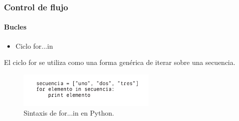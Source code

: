 \begin{frame}[fragile]
  \frametitle{Control de flujo}

    \framesubtitle{Bucles}    

  \begin{itemize}
    \item Ciclo for...in
  \end{itemize}

  El ciclo for se utiliza como una forma gen\'erica de iterar sobre una secuencia.

  \begin{figure}
    \includegraphics[width=0.6\textwidth]{Imagenes/For.jpg}
    \caption{\label{fig:Ejemplo8}Sintaxis de for...in en Python.}
  \end{figure}

\end{frame}
